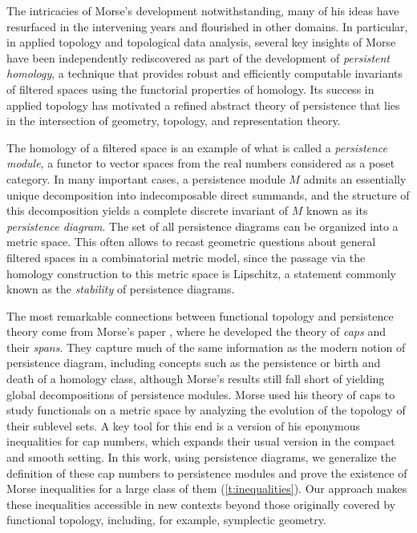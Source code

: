 The intricacies of Morse's development notwithstanding, many of his ideas have resurfaced in the intervening years and flourished in other domains.
In particular, in applied topology and topological data analysis, several key insights of Morse have been independently rediscovered as part of the development of \emph{persistent homology}, a technique that provides robust and efficiently computable invariants of filtered spaces using the functorial properties of homology.
Its success in applied topology has motivated a refined abstract theory of persistence that lies in the intersection of geometry, topology, and representation theory.

The homology of a filtered space is an example of what is called a \emph{persistence module}, a functor to vector spaces from the real numbers considered as a poset category.
In many important cases, a persistence module $M$ admits an essentially unique decomposition into indecomposable direct summands, and the structure of this decomposition yields a complete discrete invariant of $M$ known as its \emph{persistence diagram}.
The set of all persistence diagrams can be organized into a metric space.
This often allows to recast geometric questions about general filtered spaces in a combinatorial metric model, since the passage via the homology construction to this metric space is Lipschitz, a statement commonly known as the \emph{stability} of persistence diagrams.

The most remarkable connections between functional topology and persistence theory come from Morse's paper \cite{Morse.1940}, where he developed the theory of \emph{caps} and their \emph{spans}.
They capture much of the same information as the modern notion of persistence diagram, including concepts such as the persistence or birth and death of a homology class, although Morse's results still fall short of yielding global decompositions of persistence modules.
Morse used his theory of caps to study functionals on a metric space by analyzing the evolution of the topology of their sublevel sets.
A key tool for this end is a version of his eponymous inequalities for cap numbers, which expands their usual version in the compact and smooth setting.
In this work, using persistence diagrams, we generalize the definition of these cap numbers to persistence modules and prove the existence of Morse inequalities for a large class of them (\cref{t:inequalities}).
Our approach makes these inequalities accessible in new contexts beyond those originally covered by functional topology, including, for example, symplectic geometry.


